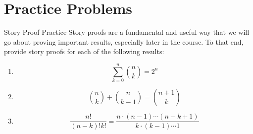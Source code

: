 \documentclass[11pt]{article}
\begin{document}
\section*{Practice Problems}
\begin{exercise}{Story Proof Practice}
Story proofs are a fundamental and useful way that we will go about proving important results, especially later in the course. To that end, provide story proofs for each of the following results:

\begin{enumerate}

1. Addition suggests combining disjoint cases, while multiplication suggests use of multiplication rule to combine steps of an experiment.

2. Look for patterns similar to the binomial theorem.

    \item
    $$\sum_{k=0}^n {n \choose k } = 2^n$$
    \item 
    $${n \choose k} + {n \choose k-1} = 
    {n+1 \choose k}$$
    \item 
    $$\frac{n!}{(n-k)!k!} = \frac{n \cdot (n-1)
    \dotsm (n-k+1)}{k\cdot (k-1)\dotsm 1}$$
\end{enumerate}
\end{exercise}
\end{document}
